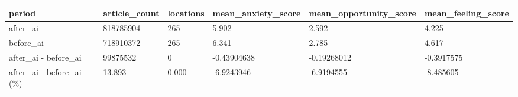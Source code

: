 \begin{tabular}{llllll}
\toprule
period & article\_count & locations & mean\_anxiety\_score & mean\_opportunity\_score & mean\_feeling\_score \\
\midrule
after\_ai & 818785904 & 265 & 5.902 & 2.592 & 4.225 \\
before\_ai & 718910372 & 265 & 6.341 & 2.785 & 4.617 \\
after\_ai - before\_ai & 99875532 & 0 & -0.43904638 & -0.19268012 & -0.3917575 \\
after\_ai - before\_ai (\%) & 13.893 & 0.000 & -6.9243946 & -6.9194555 & -8.485605 \\
\bottomrule
\end{tabular}

